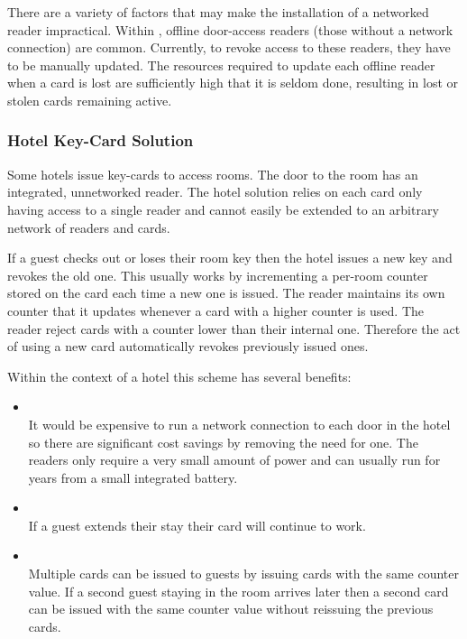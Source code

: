 \documentclass[dissertation.tex]{subfiles}
\begin{document}
  There are a variety of factors that may make the installation of a networked reader impractical. Within \UoC{}, offline door-access readers (those without a network connection) are common. Currently, to revoke access to these readers, they have to be manually updated. The resources required to update each offline reader when a card is lost are sufficiently high that it is seldom done, resulting in lost or stolen cards remaining active.

  \subsubsection{Hotel Key-Card Solution}
  Some hotels issue key-cards to access rooms. The door to the room has an integrated, unnetworked reader. The hotel solution relies on each card only having access to a single reader and cannot easily be extended to an arbitrary network of readers and cards.

  If a guest checks out or loses their room key then the hotel issues a new key and revokes the old one. This usually works by incrementing a per-room counter stored on the card each time a new one is issued. The reader maintains its own counter that it updates whenever a card with a higher counter is used. The reader reject cards with a counter lower than their internal one. Therefore the act of using a new card automatically revokes previously issued ones.

  Within the context of a hotel this scheme has several benefits:
  \begin{itemize}
    \item {} \\
      It would be expensive to run a network connection to each door in the hotel so there are significant cost savings by removing the need for one. The readers only require a very small amount of power and can usually run for years from a small integrated battery.

    \item {} \\
      If a guest extends their stay their card will continue to work.

    \item {} \\
      Multiple cards can be issued to guests by issuing cards with the same counter value. If a second guest staying in the room arrives later then a second card can be issued with the same counter value without reissuing the previous cards.

  \end{itemize}
\end{document}
